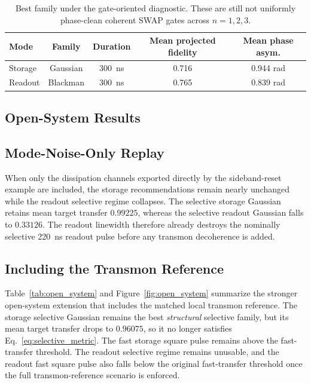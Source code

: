 \documentclass[11pt]{article}
\begin{document}
\begin{table}[t]
  \centering
  \small
  \caption{Best family under the gate-oriented diagnostic. These are still not uniformly phase-clean coherent SWAP gates across \(n=1,2,3\).}
  \label{tab:gate}
  \begin{tabular}{lcccc}
    \toprule
    Mode & Family & Duration & Mean projected fidelity & Mean phase asym. \\
    \midrule
    Storage & Gaussian & \SI{300}{ns} & 0.716 & 0.944 rad \\
    Readout & Blackman & \SI{300}{ns} & 0.765 & 0.839 rad \\
    \bottomrule
  \end{tabular}
\end{table}

\subsection{Open-System Results}
\subsection{Mode-Noise-Only Replay}
When only the dissipation channels exported directly by the sideband-reset example are included, the storage recommendations remain nearly unchanged while the readout selective regime collapses. The selective storage Gaussian retains mean target transfer \(0.99225\), whereas the selective readout Gaussian falls to \(0.33126\). The readout linewidth therefore already destroys the nominally selective \SI{220}{ns} readout pulse before any transmon decoherence is added.

\subsection{Including the Transmon Reference}
Table~\ref{tab:open_system} and Figure~\ref{fig:open_system} summarize the stronger open-system extension that includes the matched local transmon reference. The storage selective Gaussian remains the best \emph{structural} selective family, but its mean target transfer drops to \(0.96075\), so it no longer satisfies Eq.~\eqref{eq:selective_metric}. The fast storage square pulse remains above the fast-transfer threshold. The readout selective regime remains unusable, and the readout fast square pulse also falls below the original fast-transfer threshold once the full transmon-reference scenario is enforced.
\end{document}

